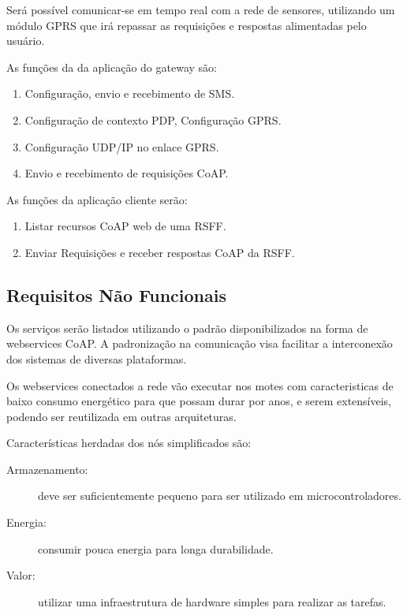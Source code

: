 Ser\'a poss\'ivel comunicar-se em tempo real com a rede de sensores, utilizando um m\'odulo GPRS que ir\'a repassar as requisi\c{c}\~oes e respostas alimentadas pelo usu\'ario.

As fun\c{c}\~oes da da aplica\c{c}\~ao do gateway s\~ao:
\begin{enumerate}
    \item Configura\c{c}\~ao, envio e recebimento de SMS.
    \item Configura\c{c}\~ao de contexto PDP, Configura\c{c}\~ao GPRS.
    \item Configura\c{c}\~ao UDP/IP no enlace GPRS.
    \item Envio e recebimento de requisi\c{c}\~oes CoAP.
\end{enumerate}

As fun\c{c}\~oes da aplica\c{c}\~ao cliente ser\~ao:

\begin{enumerate}
    \item Listar recursos CoAP web de uma RSFF.
    \item Enviar Requisi\c{c}\~oes e receber respostas CoAP da RSFF.
\end{enumerate}

\subsection{Requisitos N\~ao Funcionais}

Os servi\c{c}os ser\~ao listados utilizando o padr\~ao \cite{rfc6690} disponibilizados na forma de webservices CoAP. A padroniza\c{c}\~ao na comunica\c{c}\~ao visa facilitar a interconex\~ao dos sistemas de diversas plataformas.

Os webservices conectados a rede v\~ao executar nos motes com caracteristicas de baixo consumo energ\'etico para que possam durar por anos, e serem extens\'iveis, podendo ser reutilizada em outras arquiteturas.

Caracter\'isticas herdadas dos n\'os simplificados s\~ao:
\begin{description}
\item[Armazenamento:] deve ser suficientemente pequeno para ser utilizado em microcontroladores.
\item[Energia:] consumir pouca energia para longa durabilidade.
\item[Valor:] utilizar uma infraestrutura de hardware simples para realizar as tarefas.
\end{description}

